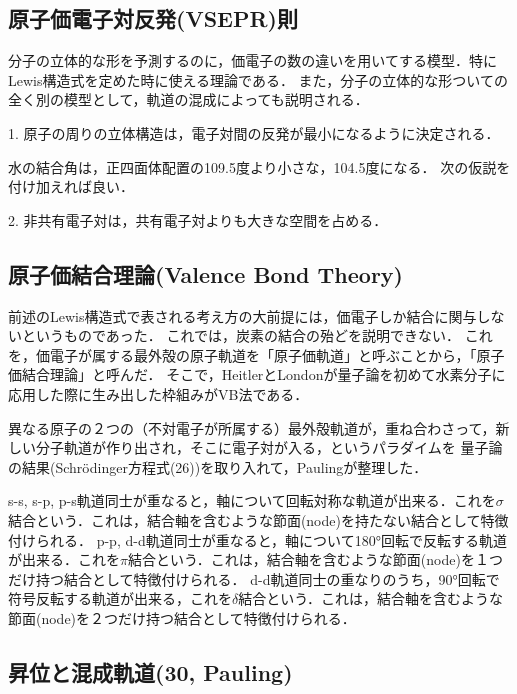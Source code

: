 \documentclass[uplatex, dvipdfmx]{jsreport}
\begin{document}
\subsection{原子価電子対反発(VSEPR)則}
分子の立体的な形を予測するのに，価電子の数の違いを用いてする模型．特にLewis構造式を定めた時に使える理論である．
また，分子の立体的な形ついての全く別の模型として，軌道の混成によっても説明される．

\begin{model}
    1. 原子の周りの立体構造は，電子対間の反発が最小になるように決定される．
\end{model}

\begin{fact}
    水の結合角は，正四面体配置の109.5度より小さな，104.5度になる．
    次の仮説を付け加えれば良い．
    
    2. 非共有電子対は，共有電子対よりも大きな空間を占める．
\end{fact}

\subsection{原子価結合理論(Valence Bond Theory)}
前述のLewis構造式で表される考え方の大前提には，価電子しか結合に関与しないというものであった．
これでは，炭素の結合の殆どを説明できない．
これを，価電子が属する最外殻の原子軌道を「原子価軌道」と呼ぶことから，「原子価結合理論」と呼んだ．
そこで，HeitlerとLondonが量子論を初めて水素分子に応用した際に生み出した枠組みがVB法である．

異なる原子の２つの（不対電子が所属する）最外殻軌道が，重ね合わさって，新しい分子軌道が作り出され，そこに電子対が入る，というパラダイムを
量子論の結果(Schrödinger方程式(26))を取り入れて，Paulingが整理した．

s-s, s-p, p-s軌道同士が重なると，軸について回転対称な軌道が出来る．これを$\sigma$結合という．これは，結合軸を含むような節面(node)を持たない結合として特徴付けられる．
p-p, d-d軌道同士が重なると，軸について180°回転で反転する軌道が出来る．これを$\pi$結合という．これは，結合軸を含むような節面(node)を１つだけ持つ結合として特徴付けられる．
d-d軌道同士の重なりのうち，90°回転で符号反転する軌道が出来る，これを$\delta$結合という．これは，結合軸を含むような節面(node)を２つだけ持つ結合として特徴付けられる．

\subsection{昇位と混成軌道(30, Pauling)}
\end{document}
